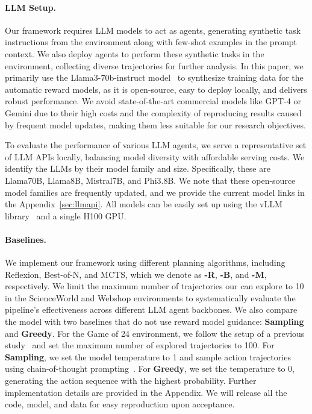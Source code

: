 \paragraph{LLM Setup.}
Our framework requires LLM models to act as agents, generating synthetic task instructions from the environment along with few-shot examples in the prompt context. We also deploy agents to perform these synthetic tasks in the environment, collecting diverse trajectories for further analysis. In this paper, we primarily use the Llama3-70b-instruct model~\citep{dubey2024llama3herdmodels} to synthesize training data for the automatic reward models, as it is open-source, easy to deploy locally, and delivers robust performance. We avoid state-of-the-art commercial models like GPT-4 or Gemini due to their high costs and the complexity of reproducing results caused by frequent model updates, making them less suitable for our research objectives.

To evaluate the performance of various LLM agents, we serve a representative set of LLM APIs locally, balancing model diversity with affordable serving costs. We identify the LLMs by their model family and size. Specifically, these are Llama70B, Llama8B, Mistral7B, and Phi3.8B. We note that these open-source model families are frequently updated, and we provide the current model links in the Appendix~\ref{sec:llmapi}. All models can be easily set up using the vLLM library~\citep{kwon2023efficient} and a single H100 GPU.

\paragraph{Baselines.} 
We implement our \Model framework using different planning algorithms, including Reflexion, Best-of-N, and MCTS, which we denote as \textbf{\Model-R}, \textbf{\Model-B}, and \textbf{\Model-M}, respectively. We limit the maximum number of trajectories our \Model can explore to 10 in the ScienceWorld and Webshop environments to systematically evaluate the pipeline's effectiveness across different LLM agent backbones. We also compare the model with two baselines that do not use reward model guidance: \textbf{Sampling} and \textbf{Greedy}. For the {Game of 24} environment, we follow the setup of a previous study~\citep{yao2023treethoughtsdeliberateproblem} and set the maximum number of explored trajectories to 100. For \textbf{Sampling}, we set the model temperature to 1 and sample action trajectories using chain-of-thought prompting~\citep{wei2023chainofthoughtpromptingelicitsreasoning}. For \textbf{Greedy}, we set the temperature to 0, generating the action sequence with the highest probability. Further implementation details are provided in the Appendix. We will release all the code, model, and data for easy reproduction upon acceptance.

